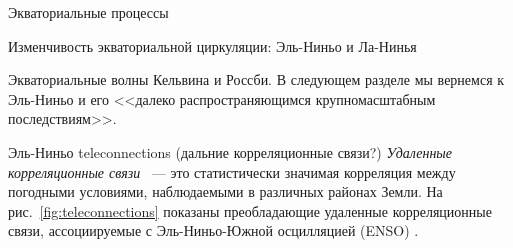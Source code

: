 \begin{chapter}{Экваториальные процессы}
\begin{section}{Изменчивость экваториальной циркуляции: Эль-Ниньо и Ла-Нинья}
\begin{paragraph}{Экваториальные волны Кельвина и Россби.}
В следующем разделе мы вернемся к Эль-Ниньо и его <<далеко 
распространяющимся крупномасштабным последствиям>>.
%
\end{paragraph}
\end{section}

\begin{section}{Эль-Ниньо teleconnections (дальние корреляционные связи?)}
\emph{Удаленные корреляционные связи}%
%
%
~--- это статистически значимая корреляция между погодными условиями, 
наблюдаемыми в различных районах Земли. На рис.~\ref{fig:teleconnections} 
показаны преобладающие удаленные корреляционные связи, ассоциируемые 
с Эль-Ниньо-Южной осцилляцией (ENSO)%
.
%


\end{section}
\end{chapter}
